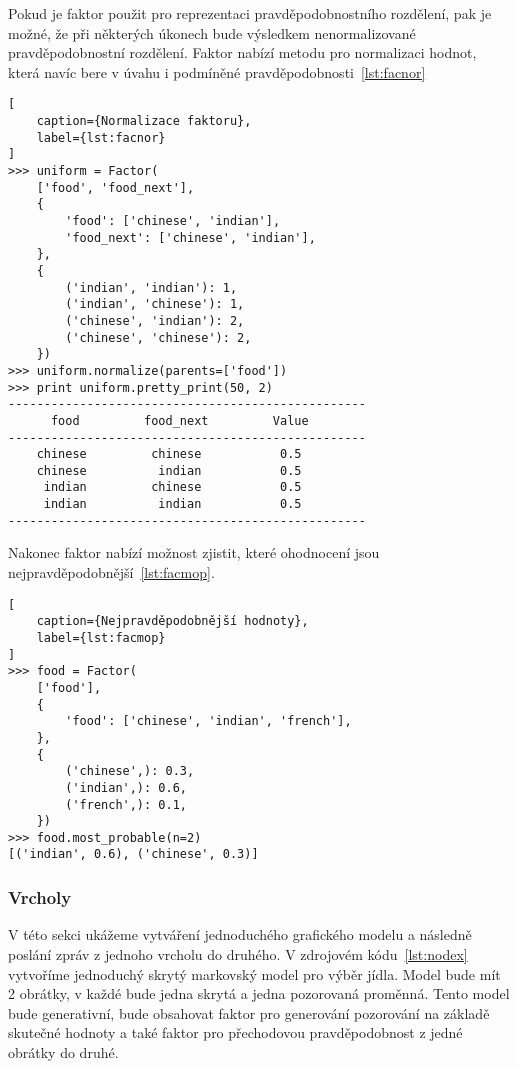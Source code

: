 Pokud je faktor použit pro reprezentaci pravděpodobnostního rozdělení, pak je možné, že při některých úkonech bude výsledkem nenormalizované pravděpodobnostní rozdělení.
Faktor nabízí metodu pro normalizaci hodnot, která navíc bere v úvahu i podmíněné pravděpodobnosti~\ref{lst:facnor}

\begin{lstlisting}[
	caption={Normalizace faktoru},
	label={lst:facnor}
]
>>> uniform = Factor(
    ['food', 'food_next'],
    {
        'food': ['chinese', 'indian'],
        'food_next': ['chinese', 'indian'],
    },
    {
		('indian', 'indian'): 1,
		('indian', 'chinese'): 1,
		('chinese', 'indian'): 2,
		('chinese', 'chinese'): 2,
    })
>>> uniform.normalize(parents=['food'])
>>> print uniform.pretty_print(50, 2)
--------------------------------------------------
      food         food_next         Value
--------------------------------------------------
    chinese         chinese           0.5
    chinese          indian           0.5
     indian         chinese           0.5
     indian          indian           0.5
--------------------------------------------------
\end{lstlisting}

Nakonec faktor nabízí možnost zjistit, které ohodnocení jsou nejpravděpodobnější~\ref{lst:facmop}.
\begin{lstlisting}[
	caption={Nejpravděpodobnější hodnoty},
	label={lst:facmop}
]
>>> food = Factor(
    ['food'],
    {
        'food': ['chinese', 'indian', 'french'],
    },
    {
		('chinese',): 0.3,
		('indian',): 0.6,
		('french',): 0.1,
    })
>>> food.most_probable(n=2)
[('indian', 0.6), ('chinese', 0.3)]
\end{lstlisting}

\subsubsection{Vrcholy}

V této sekci ukážeme vytváření jednoduchého grafického modelu a následně poslání zpráv z jednoho vrcholu do druhého.
V zdrojovém kódu~\ref{lst:nodex} vytvoříme jednoduchý skrytý markovský model pro výběr jídla.
Model bude mít 2 obrátky, v každé bude jedna skrytá a jedna pozorovaná proměnná.
Tento model bude generativní, bude obsahovat faktor pro generování pozorování na základě skutečné hodnoty a také faktor pro přechodovou pravděpodobnost z jedné obrátky do druhé.

